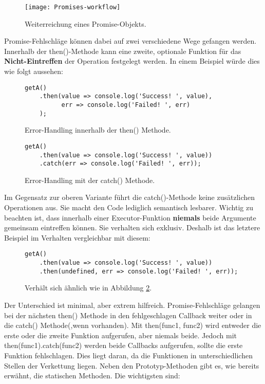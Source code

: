 \begin{figure}[H]
\texttt{[image: Promises-workflow]}
\caption{Weiterreichung eines Promise-Objekts\cite{promise-executor}.}
\label{promise-chain-graphic}
\end{figure}

\noindent
Promise-Fehlschläge können dabei auf zwei verschiedene Wege gefangen werden. Innerhalb der then()-Methode kann eine zweite, optionale Funktion für das \textbf{Nicht-Eintreffen} der Operation festgelegt werden. In einem Beispiel würde dies wie folgt aussehen:

\begin{figure}[H]
\begin{lstlisting}[basicstyle=\small]
getA()
    .then(value => console.log('Success! ', value),
          err => console.log('Failed! ', err)
    );
\end{lstlisting}
\caption{Error-Handling innerhalb der then() Methode\cite{callback-vs-promises}.}
\end{figure}

\begin{figure}[H]
\begin{lstlisting}[basicstyle=\small]
getA()
    .then(value => console.log('Success! ', value))
    .catch(err => console.log('Failed! ', err));
\end{lstlisting}
\caption{Error-Handling mit der catch() Methode\cite{callback-vs-promises}.}
\label{error-with-catch}
\end{figure}

\noindent
Im Gegensatz zur oberen Variante führt die catch()-Methode keine zusätzlichen Operationen aus. Sie macht den Code lediglich semantisch lesbarer. Wichtig zu beachten ist, dass innerhalb einer Executor-Funktion \textbf{niemals} beide Argumente gemeinsam eintreffen können. Sie verhalten sich exklusiv. Deshalb ist das letztere Beispiel im Verhalten vergleichbar mit diesem:

\begin{figure}[H]
\begin{lstlisting}[basicstyle=\small]
getA()
    .then(value => console.log('Success! ', value))
    .then(undefined, err => console.log('Failed! ', err));
\end{lstlisting}
\caption{Verhält sich ähnlich wie in Abbildung \ref{error-with-catch}.}
\end{figure}

\noindent
Der Unterschied ist minimal, aber extrem hilfreich. Promise-Fehlschläge gelangen bei der nächsten then() Methode in den fehlgeschlagen Callback weiter oder in die catch() Methode(,wenn vorhanden). Mit then(func1, func2) wird entweder die erste oder die zweite Funktion aufgerufen, aber niemals beide. Jedoch mit then(func1).catch(func2) werden beide Callbacks aufgerufen, sollte die erste Funktion fehlschlagen. Dies liegt daran, da die Funktionen in unterschiedlichen Stellen der Verkettung liegen. Neben den Prototyp-Methoden gibt es, wie bereits erwähnt, die statischen Methoden. Die wichtigsten sind:

